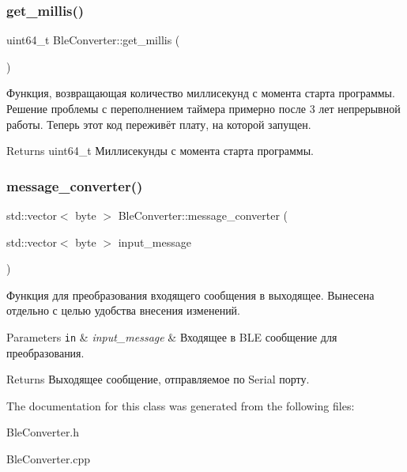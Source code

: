 \subsubsection{\texorpdfstring{get\+\_\+millis()}{get\_millis()}}
{\footnotesize\ttfamily uint64\+\_\+t Ble\+Converter\+::get\+\_\+millis (\begin{DoxyParamCaption}{ }\end{DoxyParamCaption})\hspace{0.3cm}{\ttfamily [protected]}}



Функция, возвращающая количество миллисекунд с момента старта программы.  Решение проблемы с переполнением таймера примерно после 3 лет непрерывной работы. Теперь этот код переживёт плату, на которой запущен. 

\begin{DoxyReturn}{Returns}
uint64\+\_\+t Миллисекунды с момента старта программы. 
\end{DoxyReturn}
\mbox{\label{classBleConverter_a29176df3aa77e74b459135d6e4db195e}} 
\subsubsection{\texorpdfstring{message\+\_\+converter()}{message\_converter()}}
{\footnotesize\ttfamily std\+::vector$<$ byte $>$ Ble\+Converter\+::message\+\_\+converter (\begin{DoxyParamCaption}\item[{std\+::vector$<$ byte $>$}]{input\+\_\+message }\end{DoxyParamCaption})\hspace{0.3cm}{\ttfamily [protected]}}



Функция для преобразования входящего сообщения в выходящее.  Вынесена отдельно с целью удобства внесения изменений. 


\begin{DoxyParams}[1]{Parameters}
\mbox{\tt in}  & {\em input\+\_\+message} & Входящее в B\+LE сообщение для преобразования. \\
\hline
\end{DoxyParams}
\begin{DoxyReturn}{Returns}
Выходящее сообщение, отправляемое по Serial порту. 
\end{DoxyReturn}


The documentation for this class was generated from the following files\+:\begin{DoxyCompactItemize}
\item 
Ble\+Converter.\+h\item 
Ble\+Converter.\+cpp\end{DoxyCompactItemize}

